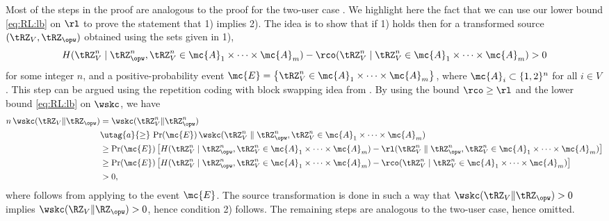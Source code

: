 {\color{blue}
\begin{IEEEproof} Most of the steps in the proof are analogous to the proof for the two-user case \cite[Theorem~4]{amin2020}. We highlight here the fact that we can use our lower bound \eqref{eq:RL:lb} on $\rl$ to prove the statement that 1) implies 2). The idea is to show that if 1) holds then for a transformed source  $(\tRZ_V,\tRZ_{\opw})$ obtained using the sets given in 1),
  \begin{align*} \label{eq:rco_nonmaximal}
     H(\tRZ^n_V \mid \tRZ^n_{\opw},\tRZ^n_V\in \mc{A}_{1}\times\cdots\times\mc{A}_{m})
      -\rco(\tRZ^n_V \mid \tRZ^n_V\in \mc{A}_{1}\times\cdots\times\mc{A}_{m})>0
 \end{align*}
 for some integer $n$, and a positive-probability event $\mc{E}=\big\{\tRZ^n_V\in \mc{A}_{1}\times\cdots\times\mc{A}_{m}\big\}$, where $\mc{A}_{i} \subset \{1,2\}^n$ for all $i \in V$. This step can be argued using the repetition coding with block swapping idea from \cite[Theorem~4]{amin2020}. By using the bound $\rco \geq \rl$ and  the lower bound \eqref{eq:RL:lb} on $\wskc$, we have
 \begin{align*}
    n \, \wskc(\tRZ_V\|\tRZ_{\opw}) & =\wskc(\tRZ^n_V\|\tRZ^n_{\opw})\\ & 
    \utag{a}{\geq} \, \Pr(\mc{E})\, \wskc(\tRZ^n_V\parallel\tRZ^n_{\opw},\tRZ^n_V\in \mc{A}_{1}\times\cdots\times\mc{A}_{m})\\
    &\geq\Pr(\mc{E})\left[H(\tRZ^n_V\mid\tRZ^n_{\opw},\tRZ^n_V\in \mc{A}_{1}\times\cdots\times\mc{A}_{m})
          -\rl(\tRZ^n_V\parallel\tRZ^n_{\opw},\tRZ^n_V\in \mc{A}_{1}\times\cdots\times\mc{A}_{m})\right]\\
          & \geq \Pr(\mc{E}) \left[H(\tRZ^n_V\mid\tRZ^n_{\opw},\tRZ^n_V\in \mc{A}_{1}\times\cdots\times\mc{A}_{m})
      -\rco(\tRZ^n_V \mid\tRZ^n_V\in \mc{A}_{1}\times\cdots\times\mc{A}_{m})\right]\\
      &>0,
 \end{align*}
 where  follows from applying \cite[Lemma~3]{maurer93} to the event $\mc{E}$. The source transformation is done in such a way that $\wskc(\tRZ_V\|\tRZ_{\opw})>0$ implies $\wskc(\RZ_V\|\RZ_{\opw}) > 0$, hence condition 2) follows. The remaining steps are analogous to the two-user case, hence omitted.
\end{IEEEproof}

\medskip

}
